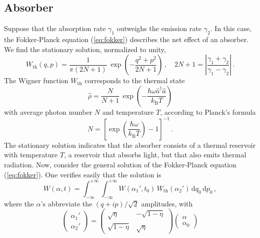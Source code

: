 \documentclass[12pt,amsmath,amssymb]{article}
\numberwithin{equation}{section}
\begin{document}
\subsection{Absorber}

Suppose that the absorption rate $\gamma_1$ outweighs the
emission rate $\gamma_2$. In this case, the Fokker-Planck
equation (\ref{eq:fokker}) describes the net effect of an
absorber. We find the stationary solution, normalized to unity,
\begin{equation}
\label{eq:wth} W_\mathrm{th}(q,p) = \frac{1}{\pi(2N+1)}\,
\exp\left(-\frac{q^2+p^2}{2N+1}\right) \,,\quad 2N+1 =
\left|\frac{\gamma_1+\gamma_2}{\gamma_1-\gamma_2}\right| \,.
\end{equation}
The Wigner function $W_\mathrm{th}$
corresponds to the thermal state
\cite{Leonhardt}
\begin{equation}
\label{eq:thermal}
\hat{\rho} = \frac{N}{N+1}\, \exp\left(-\frac{\hbar\omega\hat{a}^\dagger\hat{a}}
{k_\mathrm{B}T}\right)
\end{equation}
with average photon number $N$ and temperature
$T$, according to Planck's formula
\begin{equation}
\label{eq:planck} N =
\left[\exp\left(\frac{\hbar\omega}{k_\mathrm{B}T}\right) -
1\right]^{-1} \,.
\end{equation}
The stationary solution indicates that the absorber consists of a
thermal reservoir with temperature $T$, a reservoir that absorbs
light, but that also emits thermal radiation.
Now, consider the general solution of the  Fokker-Planck
equation (\ref{eq:fokker}). One verifies easily that the
solution is  \cite{LeoSU2}
\begin{equation}
\label{eq:fpsol} W(\alpha,t) =
\int_{-\infty}^{+\infty}\int_{-\infty}^{+\infty}
W(\alpha_1',t_0)\,W_\mathrm{th}(\alpha_2')\,
\mathrm{d}q_0\,\mathrm{d}p_0 \,,
\end{equation}
where the $\alpha$'s abbreviate the $(q+ip)/\sqrt{2}$ amplitudes,
with
\begin{equation}
\label{eq:absorber} \left(
    \begin{array}{c}
     \alpha_1'  \\
     \alpha_2'
    \end{array}
\right) = \left(
    \begin{array}{cc}
      \sqrt{\eta} & -\sqrt{1-\eta} \\
      \sqrt{1-\eta} & \sqrt{\eta}
    \end{array}
\right) \left(
    \begin{array}{c}
     \alpha  \\
     \alpha_0
    \end{array}
\right)
\end{equation}
\end{document}
